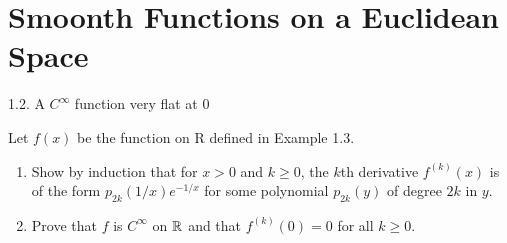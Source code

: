 \section{Smoonth Functions on a Euclidean Space}

\begin{problem}{1.2. A $C^\infty$ function very flat at $0$}

Let $f(x)$ be the function on R defined in Example 1.3.
\begin{enumerate}[label=(\alph*)]
    \item Show by induction that for $x > 0$ and $k \geq 0$, the $k$th derivative $f^{(k)}(x)$ is of the form
    $p_{2k}(1/x)e^{-1/x}$ for some polynomial $p_{2k}(y)$ of degree $2k$ in $y$.
    \item Prove that $f$ is $C^\infty$ on $\mathbb{R}$ and that $f^{(k)}(0)=0$ for all $k \geq 0$.
\end{enumerate}
\end{problem}


